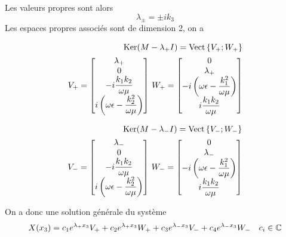 Les valeurs propres sont alors 
\begin{equation}
    \lambda_\pm = \pm i k_3
\end{equation}
Les espaces propres associés sont de dimension 2, on a 

\begin{align}
\operatorname{Ker}(M-\lambda_+I)=\operatorname{Vect}\left\lbrace V_+;W_+\right\rbrace \\
    V_+ = 
    \begin{bmatrix}
    \lambda_+ \\
        0 \\
        -i\dfrac{k_1k_2}{\omega\mu} \\
        i\left(\omega\epsilon - \dfrac{k_2^2}{\omega\mu}\right) \\
    \end{bmatrix}
    \,
    W_+ = 
        \begin{bmatrix}
        0 \\
        \lambda_+ \\
        -i\left(\omega\epsilon - \dfrac{k_1^2}{\omega\mu}\right) \\
        i\dfrac{k_1k_2}{\omega\mu} \\
    \end{bmatrix}
\end{align}

\begin{align}
\operatorname{Ker}(M-\lambda_-I)=\operatorname{Vect}\left\lbrace V_-;W_-\right\rbrace\\
    V_- = 
    \begin{bmatrix}
        \lambda_- \\
        0 \\
        -i\dfrac{k_1k_2}{\omega\mu} \\
        i\left(\omega\epsilon - \dfrac{k_2^2}{\omega\mu}\right) \\
    \end{bmatrix}
    \,
    W_- = 
    \begin{bmatrix}
        0 \\
        \lambda_- \\
        -i\left(\omega\epsilon - \dfrac{k_1^2}{\omega\mu}\right) \\
        i\dfrac{k_1k_2}{\omega\mu} \\
    \end{bmatrix}
\end{align}

On a donc une solution générale du système 
\begin{equation}
    X(x_3) = c_1e^{\lambda_+ x_3}V_+  + c_2e^{\lambda_+ x_3}W_+ + c_3e^{\lambda_- x_3}V_- +c_4e^{\lambda_- x_3}W_- \quad c_i \in \mathbb C
\end{equation}

